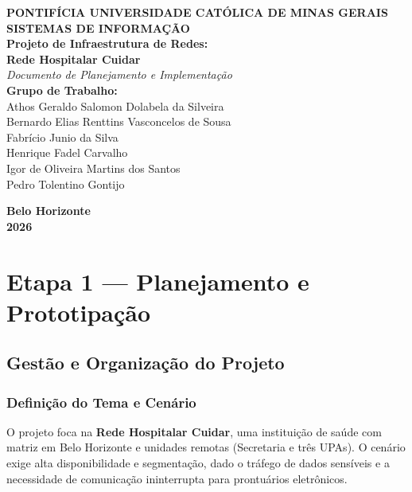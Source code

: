 \documentclass[12pt,a4paper,oneside]{report}
\begin{document}
\begin{titlepage}
    \begin{center}
        \large\textbf{\uppercase{Pontifícia Universidade Católica de Minas Gerais}}\\[0.2cm]
        \large\textbf{\uppercase{Sistemas de Informação}}\\[4cm]
        
        \huge\textbf{\color{pucblue}Projeto de Infraestrutura de Redes:\\ Rede Hospitalar Cuidar}\\[0.5cm]
        \large\textit{Documento de Planejamento e Implementação}\\[3cm]
        
        
            \textbf{Grupo de Trabalho:}\\
            \small
            Athos Geraldo Salomon Dolabela da Silveira\\
            Bernardo Elias Renttins Vasconcelos de Sousa\\
            Fabrício Junio da Silva\\
            Henrique Fadel Carvalho\\
            Igor de Oliveira Martins dos Santos\\
            Pedro Tolentino Gontijo
        
        
        \vfill
        \large\textbf{Belo Horizonte}\\
        \large\textbf{2026}
    \end{center}
\end{titlepage}

\tableofcontents
{}

\chapter{Etapa 1 --- Planejamento e Prototipação}

\section{Gestão e Organização do Projeto}

\subsection{Definição do Tema e Cenário}
O projeto foca na \textbf{Rede Hospitalar Cuidar}, uma instituição de saúde com matriz em Belo Horizonte e unidades remotas (Secretaria e três UPAs). O cenário exige alta disponibilidade e segmentação, dado o tráfego de dados sensíveis e a necessidade de comunicação ininterrupta para prontuários eletrônicos.
\end{document}

